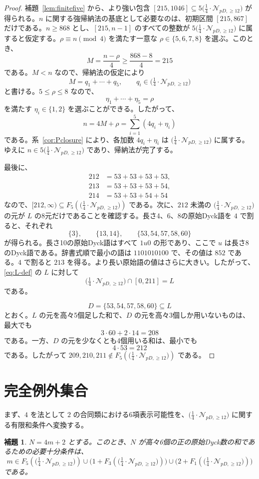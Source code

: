 \documentclass[12pt]{ltjsarticle}
\theoremstyle{plain}
\newtheorem{lemma}[theorem]{補題}
\theoremstyle{definition}
\theoremstyle{plain}
\newcommand{\Pset}{
  \bigl(\tfrac{1}{4}\cdot\mathcal{N}_{pD,\geq 12}\bigr)
}
\begin{document}
\begin{proof}
補題~\ref{lem:finitefive} から、より強い包含 $[215,1046]\subseteq5\Pset$ が得られる。$n$ に関する強帰納法の基底として必要なのは、初期区間 $[215,867]$ だけである。$n\geq868$ とし、$[215,n-1]$ のすべての整数が $5\Pset$ に属すると仮定する。$\rho\equiv n\pmod4$ を満たす一意な $\rho\in\{5,6,7,8\}$ を選ぶ。このとき、
\[
 M=\frac{n-\rho}{4}\geq\frac{868-8}{4}=215
\]
である。$M<n$ なので、帰納法の仮定により
\[
 M=q_1+\cdots+q_5,\qquad q_i\in\Pset
\]
と書ける。$5\leq\rho\leq8$ なので、
\[
 \eta_1+\cdots+\eta_5=\rho
\]
を満たす $\eta_i\in\{1,2\}$ を選ぶことができる。したがって、
\[
 n=4M+\rho=\sum_{i=1}^{5}(4q_i+\eta_i)
\]
である。系~\ref{cor:Pclosure} により、各加数 $4q_i+\eta_i$ は $\Pset$ に属する。ゆえに $n\in5\Pset$ であり、帰納法が完了する。

最後に、
\[
\begin{aligned}
212&=53+53+53+53,\\
213&=53+53+53+54,\\
214&=53+53+54+54
\end{aligned}
\]
なので、$[212,\infty)\subseteq F_5(\Pset)$ である。次に、$212$ 未満の $\Pset$ の元が $L$ の8元だけであることを確認する。長さ4、6、8の原始Dyck語を $4$ で割ると、それぞれ
\[
 \{3\},\qquad \{13,14\},\qquad \{53,54,57,58,60\}
\]
が得られる。長さ10の原始Dyck語はすべて $1u0$ の形であり、ここで $u$ は長さ8のDyck語である。辞書式順で最小の語は $1101010100$ で、その値は $852$ である。$4$ で割ると $213$ を得る。より長い原始語の値はさらに大きい。したがって、\eqref{eq:L-def} の $L$ に対して
\[
 \Pset\cap[0,211]=L
\]
である。

\[
 D=\{53,54,57,58,60\}\subseteq L
\]
とおく。$L$ の元を高々5個足した和で、$D$ の元を高々3個しか用いないものは、最大でも
\[
 3\cdot60+2\cdot14=208
\]
である。一方、$D$ の元を少なくとも4個用いる和は、最小でも
\[
 4\cdot53=212
\]
である。したがって $209,210,211\notin F_5(\Pset)$ である。
\end{proof}

\section{完全例外集合}\label{sec:exceptions}

まず、$4$ を法として $2$ の合同類における6項表示可能性を、$\Pset$ に関する有限和条件へ変換する。

\begin{lemma}\label{lem:sixcriterion}
$N=4m+2$ とする。このとき、$N$ が高々6個の正の原始Dyck数の和であるための必要十分条件は、
\[
 m\in F_5(\Pset)
 \cup\bigl(1+F_3(\Pset)\bigr)
 \cup\bigl(2+F_1(\Pset)\bigr)
\]
である。
\end{lemma}
\end{document}
